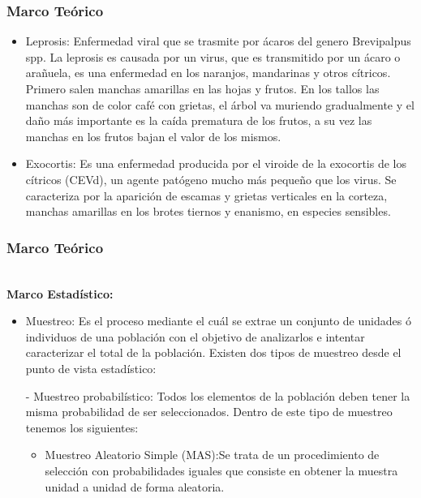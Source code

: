 \documentclass[11pt]{beamer}
\begin{document}
\begin{frame}
\frametitle{Marco Teórico}
\begin{itemize}
\item Leprosis: Enfermedad viral que se trasmite por ácaros del genero Brevipalpus spp. La leprosis es causada por un virus, que es transmitido por un ácaro o arañuela, es una enfermedad en los naranjos, mandarinas y otros cítricos. Primero salen manchas amarillas en las hojas y frutos. En los tallos las manchas son de color café con grietas, el árbol va muriendo gradualmente y el daño más importante es la caída prematura de los frutos, a su vez las manchas en los frutos bajan el valor de los mismos.
\item Exocortis: Es una enfermedad producida por el viroide de la exocortis de los cítricos (CEVd), un agente patógeno mucho más pequeño que los virus. Se caracteriza por la aparición de escamas
y grietas verticales en la corteza, manchas amarillas en los
brotes tiernos y enanismo, en especies sensibles.
\end{itemize}
\end{frame}

\begin{frame}
\frametitle{Marco Teórico}
~\\\textbf{Marco Estadístico:}
\begin{itemize}
\item Muestreo: Es el proceso mediante el cuál se extrae un conjunto de unidades ó individuos de una población con el objetivo de analizarlos e intentar caracterizar el total de la población. Existen dos tipos de muestreo desde el punto de vista estadístico:
\item[-] Muestreo probabilístico: Todos los elementos de la población deben tener la misma probabilidad de ser seleccionados. Dentro de este tipo de muestreo tenemos los siguientes:
\begin{itemize}
\item Muestreo Aleatorio Simple (MAS):Se trata de un procedimiento de selección con probabilidades iguales que consiste en obtener la muestra unidad a unidad de forma aleatoria.

\end{itemize}
\end{itemize}
\end{frame}
\end{document}
